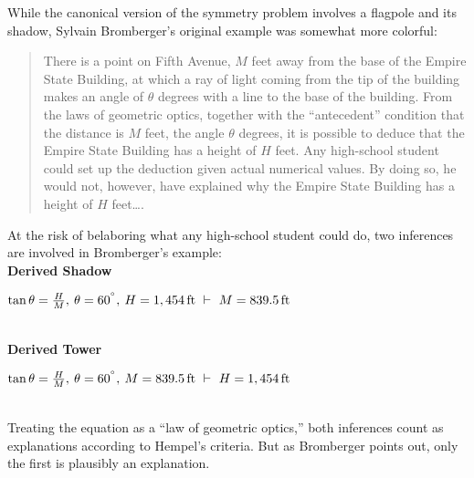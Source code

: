 \documentclass{article}                     %
\newcommand{\degree}{\ensuremath{^\circ}}
\begin{document}
While the canonical version of the symmetry problem involves a flagpole and its shadow, Sylvain Bromberger's original example was somewhat more colorful:

\begin{quote}
	There is a point on Fifth Avenue, $M$ feet away from the base of the
	Empire State Building, at which a ray of light coming from the tip of the
	building makes an angle of $\theta$ degrees with a line to the base of the
	building. From the laws of geometric optics, together with the ``antecedent''
	condition that the distance is $M$ feet, the angle $\theta$ degrees, it is
	possible to deduce that the Empire State Building has a height of $H$ feet.
	Any high-school student could set up the deduction given actual
	numerical values. By doing so, he would not, however, have explained
	why the Empire State Building has a height of $H$ feet\ldots \citep[p.92]{Bromberger1966}.
\end{quote}

\noindent At the risk of belaboring what any high-school student could do, two inferences are involved in Bromberger's example:\\

\noindent \label{eq:shadow_expl}\textbf{Derived Shadow}\hspace{8mm}\begin{minipage}[t]{.8\textwidth}
	$\tan \theta  = \frac{H}{M},\hspace{.5ex} \theta = 60^{\degree},\hspace{.5ex} H = 1,454\,\text{ft} \,\,\vdash\,\, M = 839.5\,\text{ft}$
\end{minipage}\\ 

\noindent \label{eq:height_expl}\textbf{Derived Tower}\hspace{10.5mm}\begin{minipage}[t]{.8\textwidth}
	$\tan \theta  = \frac{H}{M},\hspace{.5ex} \theta = 60^{\degree},\hspace{.5ex}  M = 839.5\,\text{ft} \,\,\vdash\,\,  H = 1,454\,\text{ft}$
\end{minipage}\\

\noindent Treating the equation as a ``law of geometric optics,'' both inferences count as explanations according to Hempel's criteria. But as Bromberger points out, only the first is plausibly an explanation. 
\end{document}
